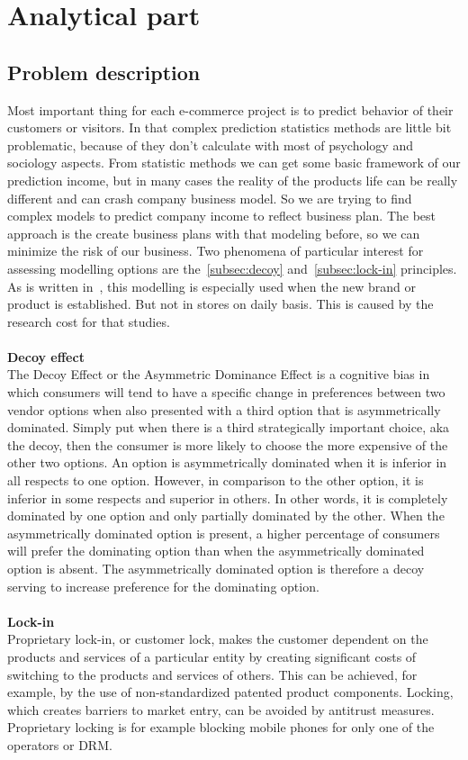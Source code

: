
\chapter{Analytical part} \label{sec:analytical}

\section{Problem description} \label{sec:description}
Most important thing for each e-commerce project is to predict behavior of their customers or visitors.
In that complex prediction statistics methods are little bit problematic, because of they don't calculate with most of psychology
and sociology aspects.
From statistic methods we can get some basic framework of our prediction income, but in many cases the reality
of the products life can be really different and can crash company business model.
So we are trying to find complex models to predict company income to reflect business plan.
The best approach is the create business plans with that modeling before, so we can minimize the risk of our business.
Two phenomena of particular interest for assessing modelling options are the~\ref{subsec:decoy} and~\ref{subsec:lock-in} principles.
As is written in~\cite{patel}, this modelling is especially used when  the new brand or product is established.
But not in stores on daily basis.
This is caused by the research cost for that studies.\\
\\
\textbf{Decoy effect} \label{subsec:decoy}\\
The Decoy Effect or the Asymmetric Dominance Effect is a cognitive bias in which consumers will tend to have a specific
change in preferences between two vendor options when also presented with a third option that is asymmetrically dominated.
Simply put when there is a third strategically important choice, aka the decoy, then the consumer is more likely to
choose the more expensive of the other two options.
An option is asymmetrically dominated when it is inferior in all respects to one option.
However, in comparison to the other option, it is inferior in some respects and superior in others.
In other words, it is completely dominated by one option and only partially dominated by the other.
When the asymmetrically dominated option is present, a higher percentage of consumers will prefer the dominating
option than when the asymmetrically dominated option is absent.
The asymmetrically dominated option is therefore a decoy serving to increase preference for the dominating option.\\
\\
\textbf{Lock-in} \label{subsec:lock-in}\\
Proprietary lock-in, or customer lock, makes the customer dependent on the products and services of a particular
entity by creating significant costs of switching to the products and services of others.
This can be achieved, for example, by the use of non-standardized patented product components.
Locking, which creates barriers to market entry, can be avoided by antitrust measures.
Proprietary locking is for example blocking mobile phones for only one of the operators or DRM.

